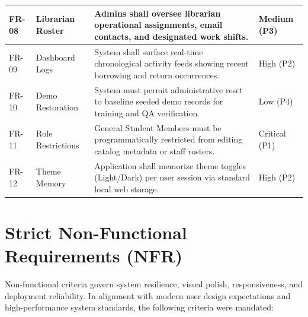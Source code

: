 \documentclass[11pt,a4paper]{report}
\begin{document}
\begin{center}
\begin{longtable}{|L{1.8cm}|L{2.8cm}|L{7.5cm}|L{3.0cm}|}
\hline
{}
FR-08 & Librarian Roster & Admins shall oversee librarian operational assignments, email contacts, and designated work shifts. & Medium (P3) \\
\hline
FR-09 & Dashboard Logs & System shall surface real-time chronological activity feeds showing recent borrowing and return occurrences. & High (P2) \\
\hline
{}
FR-10 & Demo Restoration & System must permit administrative reset to baseline seeded demo records for training and QA verification. & Low (P4) \\
\hline
FR-11 & Role Restrictions & General Student Members must be programmatically restricted from editing catalog metadata or staff rosters. & Critical (P1) \\
\hline
{}
FR-12 & Theme Memory & Application shall memorize theme toggles (Light/Dark) per user session via standard local web storage. & High (P2) \\
\hline
\end{longtable}
\end{center}

\section{Strict Non-Functional Requirements (NFR)}
Non-functional criteria govern system resilience, visual polish, responsiveness, and deployment reliability. In alignment with modern user design expectations and high-performance system standards, the following criteria were mandated:
\end{document}
